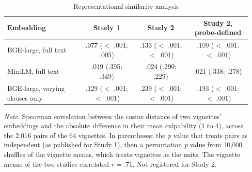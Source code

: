 \begin{table}[H]
\centering
\caption{Representational similarity analysis}
\label{tab:ml_rsa}
\footnotesize
\begin{tabular}{lccc}
\toprule
Embedding & Study 1 & Study 2 & Study 2, probe-defined \\
\midrule
BGE-large, full text & .077 ($<$ .001; .005) & .133 ($<$ .001; $<$ .001) & .109 ($<$ .001; $<$ .001) \tabularnewline
MiniLM, full text & .019 (.395; .349) & .024 (.290; .229) & .021 (.338; .278) \tabularnewline
BGE-large, varying clauses only & .129 ($<$ .001; $<$ .001) & .239 ($<$ .001; $<$ .001) & .193 ($<$ .001; $<$ .001) \tabularnewline
\bottomrule
\end{tabular}

\vspace{0.5em}
\begin{flushleft}
\footnotesize
\textit{Note.} Spearman correlation between the cosine distance of two vignettes' embeddings and the absolute difference in their mean culpability (1 to 4), across the 2,016 pairs of the 64 vignettes. In parentheses: the \textit{p} value that treats pairs as independent (as published for Study 1), then a permutation \textit{p} value from 10,000 shuffles of the vignette means, which treats vignettes as the units. The vignette means of the two studies correlated \textit{r} = .71. Not registered for Study 2.
\end{flushleft}
\end{table}
